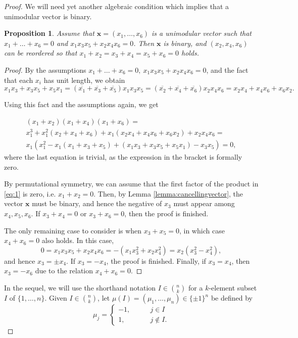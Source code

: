 \documentclass[12pt]{amsart}
\numberwithin{equation}{section}
\newcommand{\stb}{,\ldots,}
\newtheorem{proposition}[fact]{Proposition}
\theoremstyle{definition}
\theoremstyle{remark}
\theoremstyle{remark}
\newcommand{\xb}{\ensuremath{\mathbf{x}}}
\begin{document}
\begin{proof}
\medskip

We will need yet another algebraic condition which implies that a unimodular vector is binary. 

\begin{proposition}\label{alg}
	Assume that $\xb=(x_1\stb x_6)$ is a unimodular vector such that $x_1+\dots +x_6=0$ and  $x_1x_3x_5+x_2x_4x_6=0$. Then $\xb$ is binary, and $(x_2,x_4,x_6)$ can be reordered so that $x_1+x_2=x_3+x_4=x_5+x_6=0$ holds.
\end{proposition}
\begin{proof}
By the assumptions $x_1+\dots +x_6=0, \  x_1x_3x_5+x_2x_4x_6=0$,
	and the fact that each $x_i$ has unit length, we obtain
	\begin{equation}\label{eq:e2}
        x_1x_3+x_3x_5+x_5x_1=(\overline{x_1}+\overline{x_3}+\overline{x_5})x_1x_3x_5=(\overline{x_2}+\overline{x_4}+\overline{x_6})x_2x_4x_6=x_2x_4+x_4x_6+x_6x_2.
	\end{equation}

    Using this fact and the assumptions again, we get

	\begin{align}
		\label{eq:1}
		(x_1+x_2)(x_1+x_4)(x_1+x_6)=\\
x_1^3+x_1^2(x_2+x_4+x_6)+x_1(x_2x_4+x_4x_6+x_6x_2)+x_2x_4x_6=\\
x_1(x_1^2-x_1(x_1+x_3+x_5)+(x_1x_3+x_3x_5+x_5x_1)-x_3x_5)=0,
	\end{align}
where the last equation is trivial, as the expression in the bracket is formally zero.

\medskip

By permutational symmetry, we can assume that the first factor of the product in \eqref{eq:1} is zero, i.e. $x_1+x_2=0$. Then, by Lemma  \ref{lemma:cancellingvector}, the vector $\xb$ must be binary, and hence the negative of $x_3$ must appear among $x_4, x_5, x_6$. If $x_3+x_4=0$ or $x_3+x_6=0$, then the proof is finished.

\medskip

The only remaining case to consider is when $x_3+x_5=0$, in which case $x_4+x_6=0$ also holds. In this case,
	\[
	0=x_1x_3x_5+x_2x_4x_6=-(x_1x_3^2+x_2x_4^2)=x_2(x_3^2-x_4^2),
	\]
	and hence $x_3=\pm x_4$. 
    If $x_3=-x_4$, the proof is finished. Finally, if $x_3=x_4$, then $x_3=-x_6$ due to the relation $x_4+x_6=0$. 
    \end{proof}

In the sequel, we will use the shorthand notation $I\in \binom{n}{k}$ for a $k$-element subset $I$ of $\{1\stb n\}$. Given $I\in\binom{n}{k}$, let $\mu(I)=(\mu_1\stb \mu_n)\in \{\pm1\}^n$ be defined by
\begin{equation}\label{eq:muI}
	\mu_j=\begin{cases}
		-1,\qquad & j\in  I\\
		1,\qquad &j\not\in I.
	\end{cases}
\end{equation}


\end{proof}
\end{document}
